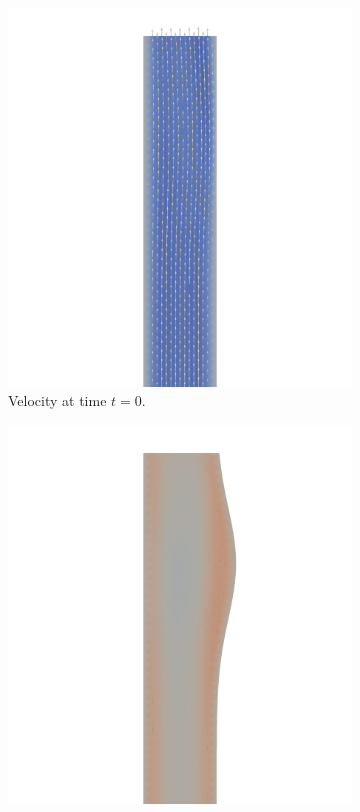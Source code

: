 \documentclass[a4paper,11pt,openright,twoside]{book}
\begin{document}
\begin{figure}[h!] 
  \begin{subfigure}[b]{0.5\linewidth}
    \centering
    \includegraphics[width=1.2\linewidth]{images/velocity_50_0.png} 
        \centering
    \caption{Velocity at time $t = 0$.} 
    \label{fig3:a} 
    \vspace{4ex}
  \end{subfigure}%
  \begin{subfigure}[b]{0.5\linewidth}
    \centering
    \includegraphics[width=1.2\linewidth]{images/velocity_50_025.png}

\end{subfigure}
\end{figure}
\end{document}
